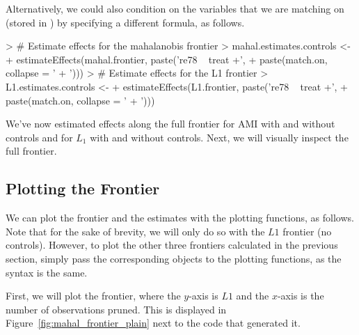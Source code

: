 \documentclass[nojss]{jss}
\begin{document}
Alternatively, we could also condition on the variables that we are
matching on (stored in ) by specifying a different
formula, as follows.

\begin{Schunk}
\begin{Sinput}
> # Estimate effects for the mahalanobis frontier
> mahal.estimates.controls <- 
+     estimateEffects(mahal.frontier, paste('re78 ~ treat +', 
+                                           paste(match.on, collapse = ' + ')))
> # Estimate effects for the L1 frontier
> L1.estimates.controls <- 
+     estimateEffects(L1.frontier, paste('re78 ~ treat +', 
+                                        paste(match.on, collapse = ' + ')))
\end{Sinput}
\end{Schunk}

We've now estimated effects along the full frontier for AMI with and
without controls and for $L_1$ with and without controls. Next, we
will visually inspect the full frontier.

\subsection{Plotting the Frontier}

We can plot the frontier and the estimates with the plotting
functions, as follows. Note that for the sake of brevity, we will only
do so with the $L1$ frontier (no controls). However, to plot the other
three frontiers calculated in the previous section, simply pass the
corresponding objects to the plotting functions, as the syntax is the
same.

First, we will plot the frontier, where the $y$-axis is $L1$ and the
$x$-axis is the number of observations pruned. This is displayed in
Figure~\ref{fig:mahal_frontier_plain} next to the code that generated
it.
\end{document}
